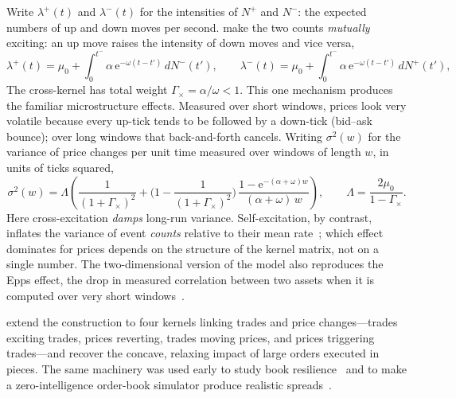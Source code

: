 Write $\lambda^{+}(t)$ and $\lambda^{-}(t)$ for the intensities of $N^{+}$ and $N^{-}$: the expected
numbers of up and down moves per second. \citet{bacry2013} make the two counts \emph{mutually}
exciting: an up move raises the intensity of down moves and vice versa,
\begin{equation}
  \lambda^{+}(t) = \mu_0 + \int_0^{t^-} \alpha\,\mathrm{e}^{-\omega (t-t')}\, dN^{-}(t'), \qquad
  \lambda^{-}(t) = \mu_0 + \int_0^{t^-} \alpha\,\mathrm{e}^{-\omega (t-t')}\, dN^{+}(t'),
\end{equation}
The cross-kernel has total weight $\Gamma_{\times} = \alpha/\omega < 1$. This one mechanism
produces the familiar microstructure effects. Measured over short windows, prices look very
volatile because every up-tick tends to be followed by a down-tick (bid--ask bounce); over long
windows that back-and-forth cancels. Writing $\sigma^2(w)$ for the variance of price changes per unit time
measured over windows of length $w$, in units of ticks squared,
\begin{equation}
  \sigma^2(w) = \Lambda\left(\frac{1}{(1+\Gamma_\times)^2} + \Big(1-\frac{1}{(1+\Gamma_\times)^2}\Big)\,\frac{1 - \mathrm{e}^{-(\alpha+\omega) w}}{(\alpha+\omega)\,w}\right),
  \qquad \Lambda = \frac{2\mu_0}{1-\Gamma_{\times}} .
\end{equation}
 Here cross-excitation \emph{damps} long-run variance.
Self-excitation, by contrast, inflates the variance of event \emph{counts} relative to their mean
rate~\citep{bacry2014}; which effect dominates for prices depends on the structure of the kernel
matrix, not on a single number. The two-dimensional version of the model also reproduces the Epps
effect, the drop in measured correlation between two assets when it is computed over very short
windows~\citep{bacry2013}.

\citet{bacry2014} extend the construction to four kernels linking trades and price changes---trades
exciting trades, prices reverting, trades moving prices, and prices triggering trades---and recover
the concave, relaxing impact of large orders executed in pieces. The same machinery was used early to
study book resilience~\citep{large2007} and to make a zero-intelligence order-book simulator produce
realistic spreads~\citep{munitoke2011}.

